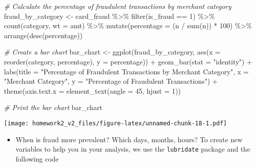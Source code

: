 \documentclass[
]{article}
\newenvironment{Shaded}{\begin{snugshade}}{\end{snugshade}}
\newcommand{\AttributeTok}[1]{\textcolor[rgb]{0.77,0.63,0.00}{#1}}
\newcommand{\CommentTok}[1]{\textcolor[rgb]{0.56,0.35,0.01}{\textit{#1}}}
\newcommand{\DecValTok}[1]{\textcolor[rgb]{0.00,0.00,0.81}{#1}}
\newcommand{\FunctionTok}[1]{\textcolor[rgb]{0.00,0.00,0.00}{#1}}
\newcommand{\NormalTok}[1]{#1}
\newcommand{\OtherTok}[1]{\textcolor[rgb]{0.56,0.35,0.01}{#1}}
\newcommand{\SpecialCharTok}[1]{\textcolor[rgb]{0.00,0.00,0.00}{#1}}
\newcommand{\StringTok}[1]{\textcolor[rgb]{0.31,0.60,0.02}{#1}}
\providecommand{\tightlist}{%
  \setlength{\itemsep}{0pt}\setlength{\parskip}{0pt}}
\begin{document}
\begin{Shaded}
\begin{Highlighting}[]
\CommentTok{\# Calculate the percentage of fraudulent transactions by merchant category}
\NormalTok{fraud\_by\_category }\OtherTok{\textless{}{-}}\NormalTok{ card\_fraud }\SpecialCharTok{\%\textgreater{}\%}
  \FunctionTok{filter}\NormalTok{(is\_fraud }\SpecialCharTok{==} \DecValTok{1}\NormalTok{) }\SpecialCharTok{\%\textgreater{}\%}
  \FunctionTok{count}\NormalTok{(category, }\AttributeTok{wt =}\NormalTok{ amt) }\SpecialCharTok{\%\textgreater{}\%}
  \FunctionTok{mutate}\NormalTok{(}\AttributeTok{percentage =}\NormalTok{ (n }\SpecialCharTok{/} \FunctionTok{sum}\NormalTok{(n)) }\SpecialCharTok{*} \DecValTok{100}\NormalTok{) }\SpecialCharTok{\%\textgreater{}\%}
  \FunctionTok{arrange}\NormalTok{(}\FunctionTok{desc}\NormalTok{(percentage))}

\CommentTok{\# Create a bar chart}
\NormalTok{bar\_chart }\OtherTok{\textless{}{-}} \FunctionTok{ggplot}\NormalTok{(fraud\_by\_category, }\FunctionTok{aes}\NormalTok{(}\AttributeTok{x =} \FunctionTok{reorder}\NormalTok{(category, percentage), }\AttributeTok{y =}\NormalTok{ percentage)) }\SpecialCharTok{+}
  \FunctionTok{geom\_bar}\NormalTok{(}\AttributeTok{stat =} \StringTok{"identity"}\NormalTok{) }\SpecialCharTok{+}
  \FunctionTok{labs}\NormalTok{(}\AttributeTok{title =} \StringTok{"Percentage of Fraudulent Transactions by Merchant Category"}\NormalTok{,}
       \AttributeTok{x =} \StringTok{"Merchant Category"}\NormalTok{, }\AttributeTok{y =} \StringTok{"Percentage of Fraudulent Transactions"}\NormalTok{) }\SpecialCharTok{+}
  \FunctionTok{theme}\NormalTok{(}\AttributeTok{axis.text.x =} \FunctionTok{element\_text}\NormalTok{(}\AttributeTok{angle =} \DecValTok{45}\NormalTok{, }\AttributeTok{hjust =} \DecValTok{1}\NormalTok{))}

\CommentTok{\# Print the bar chart}
\NormalTok{bar\_chart}
\end{Highlighting}
\end{Shaded}

\texttt{[image: homework2\_v2\_files/figure-latex/unnamed-chunk-18-1.pdf]}

\begin{itemize}
\tightlist
\item
  When is fraud more prevalent? Which days, months, hours? To create new
  variables to help you in your analysis, we use the \texttt{lubridate}
  package and the following code
\end{itemize}
\end{document}

